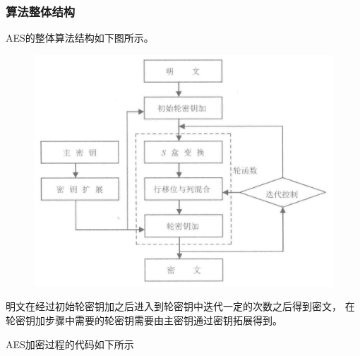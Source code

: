 \documentclass[a4paper,11pt,UTF8]{ctexart}
\newcommand{\bottomcaption}{%
\setlength{\abovecaptionskip}{6pt}%
\setlength{\belowcaptionskip}{6pt}%
\caption}
\newcommand{\xiaowuhao}{\fontsize{9pt}{\baselineskip}\selectfont}   %
\begin{document}
        \subsubsection{算法整体结构}
            AES的整体算法结构如下图所示。
            \begin{figure}[H]
                \centering
                \includegraphics[width=13cm]{AES算法结构.jpg}
                \bottomcaption{\xiaowuhao{AES算法结构}}
            \end{figure}
            明文在经过初始轮密钥加之后进入到轮密钥中迭代一定的次数之后得到密文，
            在轮密钥加步骤中需要的轮密钥需要由主密钥通过密钥拓展得到。\par
            AES加密过程的代码如下所示
            
\end{document}
